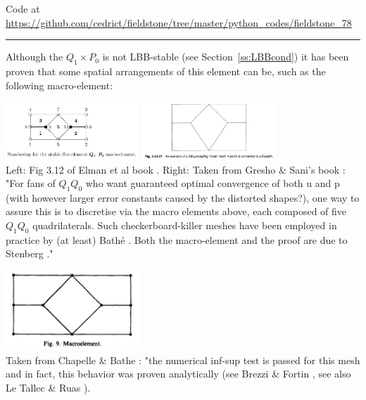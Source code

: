 

\begin{center}
Code at \url{https://github.com/cedrict/fieldstone/tree/master/python_codes/fieldstone_78}
\end{center}

\par\noindent\rule{\textwidth}{0.4pt}



Although the $Q_1\times P_0$ is not LBB-stable (see Section~\ref{ss:LBBcond})
it has been proven that some spatial arrangements of this element can be, such as the
following macro-element:

\begin{center}
\includegraphics[width=5cm]{python_codes/fieldstone_78/images/elsw}
\includegraphics[width=5cm]{python_codes/fieldstone_78/images/grsa}\\
{\captionfont Left: Fig 3.12 of Elman et al book \cite{elsw}.
Right: Taken from Gresho \& Sani's book \cite{grsa}: "For fans of $Q_1Q_0$ who want 
guaranteed optimal convergence of both u and p (with however larger error 
constants caused by the distorted shapes?), one way to assure this is
to discretise via the macro elements above, each composed of five $Q_1Q_0$
quadrilaterals. Such checkerboard-killer meshes have been employed in practice
by (at least) Bath\'e \cite{chba93}. Both the macro-element and the proof are
due to Stenberg \cite{sten84}."}
\end{center}

\begin{center}
\includegraphics[width=5cm]{python_codes/fieldstone_78/images/chba93}\\
{\captionfont Taken from Chapelle \& Bathe \cite{chba93}: "the numerical inf-sup test is passed for this mesh and in fact,
this behavior was proven analytically (see Brezzi \& Fortin \cite{brfo}, see also Le Tallec \& Ruas \cite{leru86}).}
\end{center}

